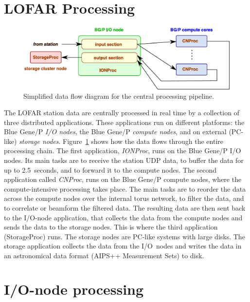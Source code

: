 \documentclass{sig-alternate}
\begin{document}
\section{LOFAR Processing}

\begin{figure}[ht]
\includegraphics[width=\columnwidth]{processing-overview.pdf}
\caption{Simplified data flow diagram for the central processing pipeline.}
\label{fig:processing}
\end{figure}

The LOFAR station data are centrally processed in real time by a collection
of three distributed applications.
These applications run on different platforms:
the Blue Gene/P \emph{I/O nodes}, the Blue Gene/P \emph{compute nodes}, and on
external (PC-like) \emph{storage nodes}.
Figure~\ref{fig:processing} shows how the data flows through the entire
processing chain.
The first application, \emph{IONProc}, runs on the Blue Gene/P I/O nodes.
Its main tasks are to receive the station UDP data, to buffer the data
for up to 2.5~seconds, and to forward it to the compute nodes.
The second application called \emph{CNProc}, runs on the Blue Gene/P compute nodes, where the
compute-intensive processing takes place.
The main tasks are to reorder the data across the compute nodes over the
internal torus network, to filter the data, and to correlate or beamform
the filtered data.
The resulting data are then sent back to the I/O-node application, that
collects the data from the compute nodes and
sends the data to the storage nodes.
This is where the third application (StorageProc) runs.
The storage nodes are PC-like systems with large disks.
The storage application collects the data from the I/O~nodes and writes the
data in an astronomical data format (AIPS++ Measurement Sets) to disk.


\section{I/O-node processing}
\label{sec:I/O-node-processing}
\end{document}
